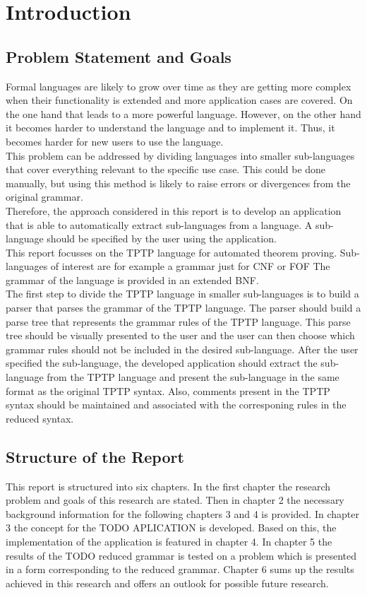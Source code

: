 
\chapter{Introduction}\label{cha:Introduction}

\section{Problem Statement and Goals}\label{sec:Aufgabenstellung}
Formal languages are likely to grow over time as they are getting more complex when their functionality is extended and more application cases are covered.
On the one hand that leads to a more powerful language.
However, on the other hand it becomes harder to understand the language and to implement it.
Thus, it becomes harder for new users to use the language.\\
This problem can be addressed by dividing languages into smaller sub-languages that cover everything relevant to the specific use case. 
This could be done manually, but using this method is likely to raise errors or divergences from the original grammar.\\
Therefore, the approach considered in this report is to develop an application that is able to automatically extract sub-languages from a language.
A sub-language should be specified by the user using the application.\\
This report focusses on the \acf{TPTP} language for automated theorem proving.
Sub-languages of interest are for example a grammar just for \ac{CNF} or \ac{FOF}
The grammar of the language is provided in an extended \acf{BNF}.\\
The first step to divide the \ac{TPTP} language in smaller sub-languages is to build a parser that parses the grammar of the \ac{TPTP} language.
The parser should build a parse tree that represents the grammar rules of the \ac{TPTP} language.
This parse tree should be visually presented to the user and the user can then choose which grammar rules should not be included in the desired sub-language.
After the user specified the sub-language, the developed application should extract the sub-language from the \ac{TPTP} language and present the sub-language in the same format as the original \ac{TPTP} syntax.
Also, comments present in the \ac{TPTP} syntax should be maintained and associated with the corresponing rules in the reduced syntax.
\section{Structure of the Report}\label{sec:Structure}
This report is structured into six chapters. In the first chapter the research problem and goals of this research are stated. Then in chapter 2 the necessary background information for the following chapters 3 and 4 is provided. In chapter 3 the concept for the TODO APLICATION is developed. Based on this, the implementation of the application is featured in chapter 4. In chapter 5 the results of the TODO reduced grammar is tested on a problem which is presented in a form corresponding to the reduced grammar. Chapter 6 sums up the results achieved in this research and offers an outlook for possible future research.